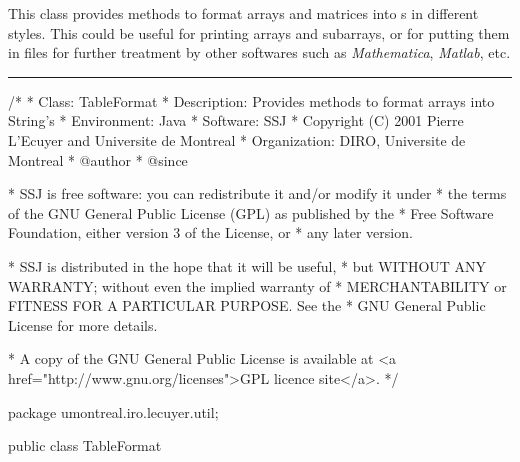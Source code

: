 
This class provides methods to format arrays and matrices into
s in different styles.
This  could be useful for printing arrays and subarrays, or for
putting them in files for further treatment by other softwares such
as {\em Mathematica\/}, {\em Matlab\/}, etc.

\bigskip\hrule

\begin{code}\begin{hide}
/*
 * Class:        TableFormat
 * Description:  Provides methods to format arrays into String's
 * Environment:  Java
 * Software:     SSJ
 * Copyright (C) 2001  Pierre L'Ecuyer and Universite de Montreal
 * Organization: DIRO, Universite de Montreal
 * @author
 * @since

 * SSJ is free software: you can redistribute it and/or modify it under
 * the terms of the GNU General Public License (GPL) as published by the
 * Free Software Foundation, either version 3 of the License, or
 * any later version.

 * SSJ is distributed in the hope that it will be useful,
 * but WITHOUT ANY WARRANTY; without even the implied warranty of
 * MERCHANTABILITY or FITNESS FOR A PARTICULAR PURPOSE.  See the
 * GNU General Public License for more details.

 * A copy of the GNU General Public License is available at
   <a href="http://www.gnu.org/licenses">GPL licence site</a>.
 */
\end{hide}
package umontreal.iro.lecuyer.util;

public class TableFormat\begin{hide} {
   private TableFormat() {}\end{hide}
\end{code}

